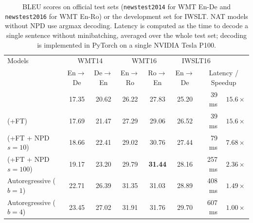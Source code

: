 \documentclass{article} %
\begin{document}
\begin{table}[t]
\small
  \centering
    \begin{tabular}{l|cccc|crr}
    \toprule
    Models                  & \multicolumn{2}{c}{WMT14} & \multicolumn{2}{c|}{WMT16} & \multicolumn{2}{c}{IWSLT16} \\
    \multicolumn{1}{c}{}   & \multicolumn{1}{|c}{En$\rightarrow$De} & \multicolumn{1}{c}{De$\rightarrow$En} & \multicolumn{1}{c}{En$\rightarrow$Ro} & \multicolumn{1}{c|}{Ro$\rightarrow$En} & \multicolumn{1}{c}{En$\rightarrow$De} & \multicolumn{2}{c}{Latency / Speedup}  \\
    \midrule
    
     
         \model{}                       & 17.35 & 20.62& 26.22 & 27.83&  25.20 & 39 ms & $15.6 \times$ \\
         
         \model{} (+FT)                 & 17.69& 21.47 & 27.29 & 29.06&  26.52 & 39 ms & $15.6 \times$\\
         
         
         \model{} (+FT + NPD $s=10$)     & 18.66 & 22.41& 29.02&  30.76 & 27.44 & 79 ms & $7.68 \times$\\
         
         \model{} (+FT + NPD $s=100$)    & 19.17 & 23.20 & 29.79&  \textbf{31.44}     & 28.16 & 257 ms & $2.36 \times$ \\
         \midrule
         Autoregressive ($b=1$)         & 22.71 & 26.39 & 31.35 & 31.03 & 28.89 & 408 ms & $1.49 \times$ \\
    	 Autoregressive ($b=4$)         & 23.45 & 27.02 & 31.91 & 31.76 & 29.70 & 607 ms & $1.00 \times$ \\
    		
    
    \bottomrule
    \end{tabular}
     \caption{BLEU scores on official test sets (\texttt{newstest2014} for WMT En-De and \texttt{newstest2016} for WMT En-Ro) or the development set for IWSLT. NAT models without NPD use argmax decoding. Latency is computed as the time to decode a single sentence without minibatching, averaged over the whole test set; decoding is implemented in PyTorch on a single NVIDIA Tesla P100.}
     \vspace{-10pt}
  \label{tab:bleu}%
\end{table}
\end{document}
